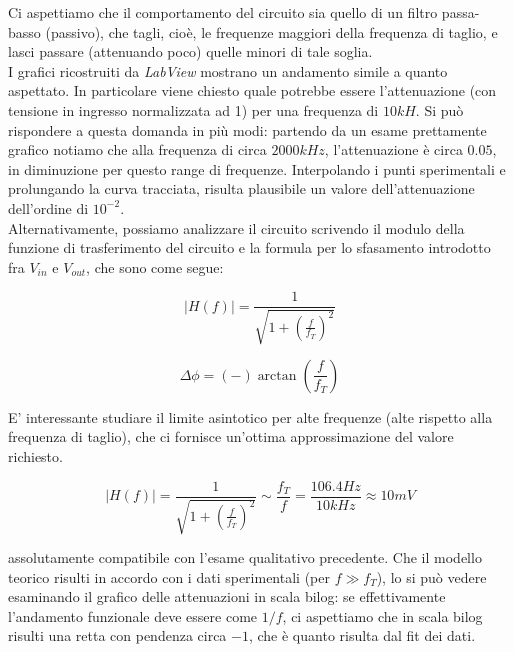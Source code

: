 \documentclass[journal, a4paper]{IEEEtran}
\begin{document}
Ci aspettiamo che il comportamento del circuito sia quello di un filtro passa-basso (passivo), che tagli, cioè, le frequenze maggiori della frequenza di taglio, e lasci passare (attenuando poco) quelle minori di tale soglia. \\
I grafici ricostruiti da \textit{LabView} mostrano un andamento simile a quanto aspettato. In particolare viene chiesto quale potrebbe essere l'attenuazione (con tensione in ingresso normalizzata ad 1) per una frequenza di $10 \si{kH}$. Si può rispondere a questa domanda in più modi: partendo da un esame prettamente grafico notiamo che alla frequenza di circa $2000\si{kHz}$, l'attenuazione è circa $0.05$, in diminuzione per questo range di frequenze. Interpolando i punti sperimentali e prolungando la curva tracciata, risulta plausibile un valore dell'attenuazione dell'ordine di $10^{-2}$. \\
Alternativamente, possiamo analizzare il circuito scrivendo il modulo della funzione di trasferimento del circuito e la formula per lo sfasamento introdotto fra $V_{in}$ e $V_{out}$, che sono come segue:

\begin{equation}\label{F_trasf}
\rvert H(f) \lvert = \frac{1}{\sqrt{1+(\frac{f}{f_T})^2}}
\end{equation}

\begin{equation}
\Delta \phi = (-)\arctan(\frac{f}{f_T})
\end{equation}


E' interessante studiare il limite asintotico per alte frequenze (alte rispetto alla frequenza di taglio), che ci fornisce un'ottima approssimazione del valore richiesto.

\begin{equation}
\rvert H(f) \lvert = \frac{1}{\sqrt{1+(\frac{f}{f_T})^2}}
\sim \frac{f_T}{f} 
= \frac{106.4 \si{Hz}}{10\si{kHz}} 
\approx 10 mV 
\end{equation}


assolutamente compatibile con l'esame qualitativo precedente. Che il modello teorico risulti in accordo con i dati sperimentali (per $f \gg f_T$), lo si può vedere esaminando il grafico delle attenuazioni in scala bilog: se effettivamente l'andamento funzionale deve essere come $1/f$, ci aspettiamo che in scala bilog risulti una retta con pendenza circa $-1$, che è quanto risulta dal fit dei dati.
\end{document}

